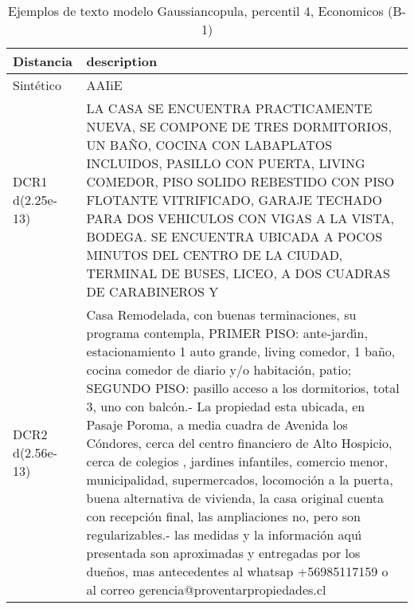 \begin{table}[H]
\centering
\fontsize{10}{14}\selectfont
\caption{Ejemplos de texto modelo Gaussiancopula, percentil 4, Economicos (B-1)}
\label{table-example-economicos-b-1-gaussiancopula-4p-text}
\begin{tabular}{|l|m{35em}|}
\hline
\rowcolor[gray]{0.8}
Distancia & description \\
\hline Sintético & AAIiE \\
\hline DCR1 d(2.25e-13) & LA CASA SE ENCUENTRA PRACTICAMENTE NUEVA, SE COMPONE DE TRES DORMITORIOS, UN BA\~NO, COCINA CON LABAPLATOS INCLUIDOS, PASILLO CON PUERTA, LIVING COMEDOR, PISO SOLIDO REBESTIDO CON PISO FLOTANTE VITRIFICADO, GARAJE TECHADO PARA DOS VEHICULOS CON VIGAS A LA VISTA, BODEGA. SE ENCUENTRA UBICADA A POCOS MINUTOS DEL CENTRO DE LA CIUDAD, TERMINAL DE BUSES, LICEO, A DOS CUADRAS DE CARABINEROS Y  \\
\hline DCR2 d(2.56e-13) & Casa Remodelada, con buenas terminaciones, su programa contempla, PRIMER PISO: ante-jard{\'\i}n, estacionamiento 1 auto grande, living comedor, 1 ba\~no, cocina comedor de diario y/o habitaci\'on, patio; SEGUNDO PISO: pasillo acceso a los dormitorios, total 3, uno con balc\'on.- La propiedad esta ubicada, en Pasaje Poroma, a media cuadra de Avenida los C\'ondores, cerca del centro financiero de Alto Hospicio, cerca de colegios , jardines infantiles, comercio menor, municipalidad, supermercados, locomoci\'on a la puerta, buena alternativa de vivienda, la casa original cuenta con recepci\'on final, las ampliaciones no, pero son regularizables.-
las medidas y la informaci\'on aqu{\'\i} presentada son aproximadas y entregadas por los due\~nos, mas antecedentes al whatsap +56985117159 o al correo gerencia@proventarpropiedades.cl
  \\
\hline
\end{tabular}
\end{table}
